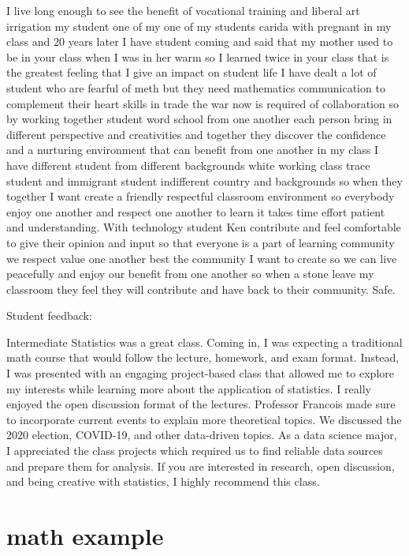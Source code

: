 \documentclass[
]{book}
\begin{document}
I live long enough to see the benefit of vocational training and liberal art irrigation my student one of my one of my students carida with pregnant in my class and 20 years later I have student coming and said that my mother used to be in your class when I was in her warm so I learned twice in your class that is the greatest feeling that I give an impact on student life
I have dealt a lot of student who are fearful of meth but they need mathematics communication to complement their heart skills in trade the war now is required of collaboration so by working together student word school from one another each person bring in different perspective and creativities and together they discover the confidence and a nurturing environment that can benefit from one another in my class I have different student from different backgrounds white working class trace student and immigrant student indifferent country and backgrounds so when they together I want create a friendly respectful classroom environment so everybody enjoy one another and respect one another to learn it takes time effort patient and understanding. With technology student Ken contribute and feel comfortable to give their opinion and input so that everyone is a part of learning community we respect value one another best the community I want to create so we can live peacefully and enjoy our benefit from one another so when a stone leave my classroom they feel they will contribute and have back to their community. Safe.

Student feedback:

Intermediate Statistics was a great class. Coming in, I was expecting a traditional math course that would follow the lecture, homework, and exam format. Instead, I was presented with an engaging project-based class that allowed me to explore my interests while learning more about the application of statistics. I really enjoyed the open discussion format of the lectures. Professor Francois made sure to incorporate current events to explain more theoretical topics. We discussed the 2020 election, COVID-19, and other data-driven topics. As a data science major, I appreciated the class projects which required us to find reliable data sources and prepare them for analysis. If you are interested in research, open discussion, and being creative with statistics, I highly recommend this class.

\section{math example}\label{math-example}
\end{document}

